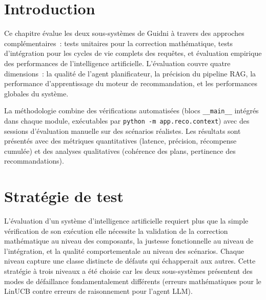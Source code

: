 
\section{Introduction}

Ce chapitre évalue les deux sous-systèmes de Guidni à travers des approches complémentaires~:
tests unitaires pour la correction mathématique, tests d'intégration pour les cycles de vie
complets des requêtes, et évaluation empirique des performances de l'intelligence artificielle.
L'évaluation couvre quatre dimensions~: la qualité de l'agent planificateur, la précision du
pipeline RAG, la performance d'apprentissage du moteur de recommandation, et les performances
globales du système.

La méthodologie combine des vérifications automatisées (blocs \texttt{\_\_main\_\_} intégrés
dans chaque module, exécutables par \texttt{python -m app.reco.context}) avec des sessions
d'évaluation manuelle sur des scénarios réalistes. Les résultats sont présentés avec des
métriques quantitatives (latence, précision, récompense cumulée) et des analyses qualitatives
(cohérence des plans, pertinence des recommandations).


\section{Stratégie de test}

L'évaluation d'un système d'intelligence artificielle requiert plus que la simple vérification
de son exécution   elle nécessite la validation de la correction mathématique au niveau des
composants, la justesse fonctionnelle au niveau de l'intégration, et la qualité comportementale
au niveau des scénarios. Chaque niveau capture une classe distincte de défauts qui échapperait
aux autres. Cette stratégie à trois niveaux a été choisie car les deux sous-systèmes
présentent des modes de défaillance fondamentalement différents (erreurs mathématiques
pour le LinUCB contre erreurs de raisonnement pour l'agent LLM).

